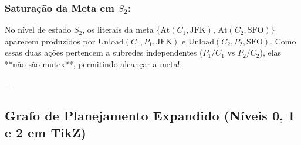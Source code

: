 \documentclass[a4paper,12pt]{article}
\begin{document}
\subsubsection*{Saturação da Meta em $S_2$:}
No nível de estado $S_2$, os literais da meta $\{\text{At}(C_1, \text{JFK}), \, \text{At}(C_2, \text{SFO})\}$ aparecem produzidos por $\text{Unload}(C_1, P_1, \text{JFK})$ e $\text{Unload}(C_2, P_2, \text{SFO})$. Como essas duas ações pertencem a subredes independentes ($P_1/C_1$ vs $P_2/C_2$), elas **não são mutex**, permitindo alcançar a meta!

---

\subsection*{Grafo de Planejamento Expandido (Níveis 0, 1 e 2 em TikZ)}
\end{document}

